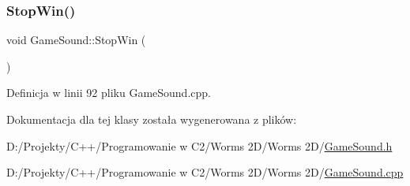\mbox{\label{class_game_sound_a1001607a8791e3000aff36fcc2d949f3}} 
\subsubsection{\texorpdfstring{Stop\+Win()}{StopWin()}}
{\footnotesize\ttfamily void Game\+Sound\+::\+Stop\+Win (\begin{DoxyParamCaption}{ }\end{DoxyParamCaption})}



Definicja w linii 92 pliku Game\+Sound.\+cpp.



Dokumentacja dla tej klasy została wygenerowana z plików\+:\begin{DoxyCompactItemize}
\item 
D\+:/\+Projekty/\+C++/\+Programowanie w C2/\+Worms 2\+D/\+Worms 2\+D/\mbox{\hyperlink{_game_sound_8h}{Game\+Sound.\+h}}\item 
D\+:/\+Projekty/\+C++/\+Programowanie w C2/\+Worms 2\+D/\+Worms 2\+D/\mbox{\hyperlink{_game_sound_8cpp}{Game\+Sound.\+cpp}}\end{DoxyCompactItemize}
